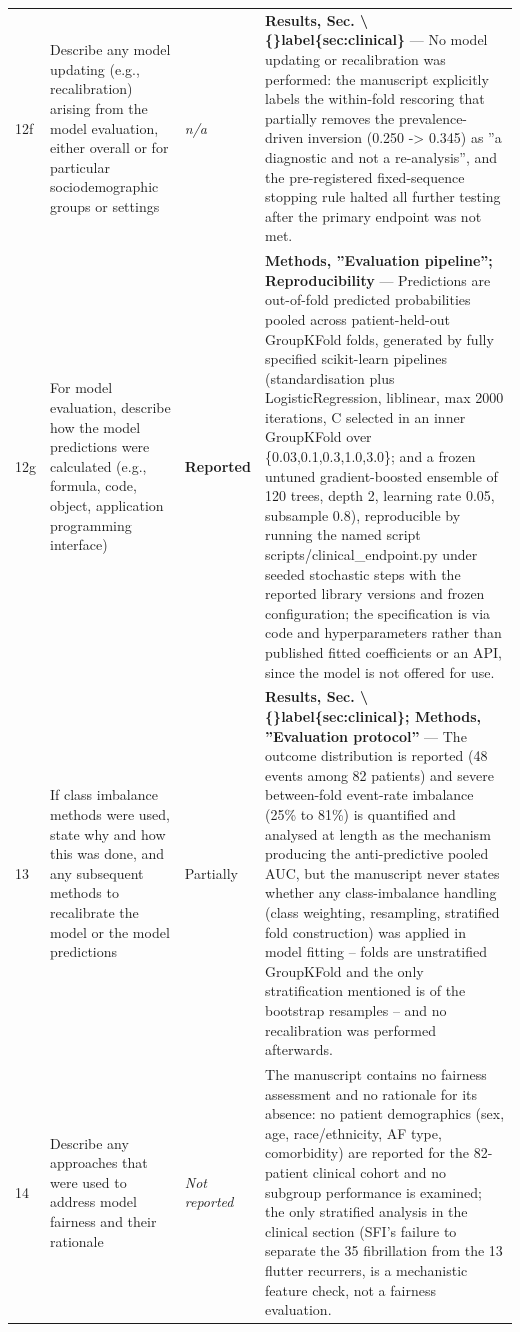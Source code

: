 \documentclass[10pt]{article}
\begin{document}
\begin{longtable}{@{}p{0.9cm} p{6.2cm} p{1.9cm} p{12.4cm}@{}}
12f & Describe any model updating (e.g., recalibration) arising from the model evaluation, either overall or for particular sociodemographic groups or settings & \emph{n/a} & \textbf{Results, Sec. \textbackslash\{\}label\{sec:clinical\}} --- No model updating or recalibration was performed: the manuscript explicitly labels the within-fold rescoring that partially removes the prevalence-driven inversion (0.250 -> 0.345) as ''a diagnostic and not a re-analysis'', and the pre-registered fixed-sequence stopping rule halted all further testing after the primary endpoint was not met. \\[2pt]
12g & For model evaluation, describe how the model predictions were calculated (e.g., formula, code, object, application programming interface) & \textbf{Reported} & \textbf{Methods, ''Evaluation pipeline''; Reproducibility} --- Predictions are out-of-fold predicted probabilities pooled across patient-held-out GroupKFold folds, generated by fully specified scikit-learn pipelines (standardisation plus LogisticRegression, liblinear, max 2000 iterations, C selected in an inner GroupKFold over \{0.03,0.1,0.3,1.0,3.0\}; and a frozen untuned gradient-boosted ensemble of 120 trees, depth 2, learning rate 0.05, subsample 0.8), reproducible by running the named script scripts/clinical\_endpoint.py under seeded stochastic steps with the reported library versions and frozen configuration; the specification is via code and hyperparameters rather than published fitted coefficients or an API, since the model is not offered for use. \\[2pt]
13 & If class imbalance methods were used, state why and how this was done, and any subsequent methods to recalibrate the model or the model predictions & Partially & \textbf{Results, Sec. \textbackslash\{\}label\{sec:clinical\}; Methods, ''Evaluation protocol''} --- The outcome distribution is reported (48 events among 82 patients) and severe between-fold event-rate imbalance (25\% to 81\%) is quantified and analysed at length as the mechanism producing the anti-predictive pooled AUC, but the manuscript never states whether any class-imbalance handling (class weighting, resampling, stratified fold construction) was applied in model fitting -- folds are unstratified GroupKFold and the only stratification mentioned is of the bootstrap resamples -- and no recalibration was performed afterwards. \\[2pt]
14 & Describe any approaches that were used to address model fairness and their rationale & \emph{Not reported} & The manuscript contains no fairness assessment and no rationale for its absence: no patient demographics (sex, age, race/ethnicity, AF type, comorbidity) are reported for the 82-patient clinical cohort and no subgroup performance is examined; the only stratified analysis in the clinical section (SFI's failure to separate the 35 fibrillation from the 13 flutter recurrers, is a mechanistic feature check, not a fairness evaluation. \\[2pt]

\end{longtable}
\end{document}
